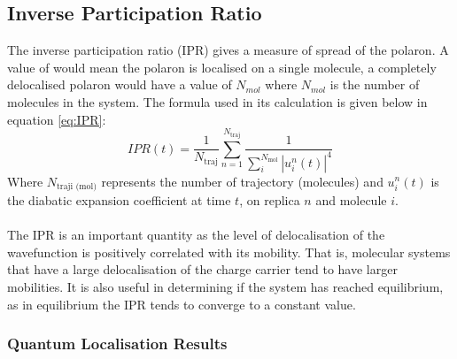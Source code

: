 \subsection{Inverse Participation Ratio}
The inverse participation ratio (IPR) gives a measure of spread of the polaron. A value of  would mean the polaron is localised on a single molecule, a completely delocalised polaron would have a value of $N_{mol}$ where $N_{mol}$ is the number of molecules in the system. The formula used in its calculation is given below in equation \eqref{eq:IPR}:
\begin{equation}
  IPR(t) = \frac{1}{N_{\text{traj}}} \sum_{n=1}^{N_{\text{traj}}} \frac{1}{\sum_{i}^{N_{\text{mol}}} \left| u_{i}^{n}(t) \right|^4}
  \label{eq:IPR}
\end{equation}
Where $N_{\text{traji (mol)}}$ represents the number of trajectory (molecules) and $u_{i}^{n}(t)$ is the diabatic expansion coefficient at time $t$, on replica $n$ and molecule $i$. 
\\\\
The IPR is an important quantity as the level of delocalisation of the wavefunction is positively correlated with its mobility. That is, molecular systems that have a large delocalisation of the charge carrier tend to have larger mobilities. It is also useful in determining if the system has reached equilibrium, as in equilibrium the IPR tends to converge to a constant value.
\subsubsection{Quantum Localisation Results}

